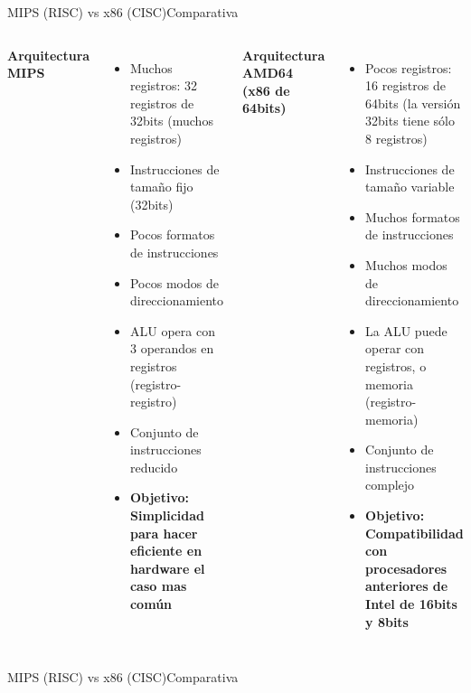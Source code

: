 \documentclass[aspectratio=169,compress]{beamer}
\begin{document}
\begin{footnotesize}
\begin{frame}{MIPS (RISC) vs x86 (CISC)}{Comparativa}
\begin{footnotesize}
\begin{columns}[onlytextwidth,T]
      \column{70mm}
\bigskip
\begin{center}\textbf{Arquitectura MIPS}\end{center}
\begin{itemize}
\item Muchos registros: 32 registros de 32bits (muchos registros)
\item Instrucciones de tamaño fijo (32bits)
\item Pocos formatos de instrucciones
\item Pocos modos de direccionamiento
\item ALU opera con 3 operandos en registros (registro-registro)
\item Conjunto de instrucciones reducido
\item \textbf{Objetivo: Simplicidad para hacer eficiente en hardware el caso mas común}
\end{itemize}

      \column{80mm}

\bigskip
\begin{center}\textbf{Arquitectura AMD64 (x86 de 64bits)}\end{center}
\begin{itemize}
\item Pocos registros: 16 registros de 64bits (la versión 32bits tiene sólo 8 registros)
\item Instrucciones de tamaño variable
\item Muchos formatos de instrucciones
\item Muchos modos de direccionamiento
\item La ALU puede operar con registros, o memoria (registro-memoria)
\item Conjunto de instrucciones complejo
\item \textbf{Objetivo: Compatibilidad con procesadores anteriores de Intel de 16bits y 8bits}
\end{itemize}
    \end{columns}
\end{footnotesize}
\end{frame}



\begin{frame}{MIPS (RISC) vs x86 (CISC)}{Comparativa}

 \begin{columns}[onlytextwidth,T]

      \column{90mm}


\end{columns}
\end{frame}
\end{footnotesize}
\end{document}
